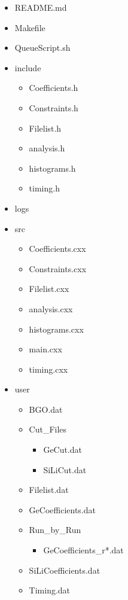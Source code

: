 \begin{itemize}[noitemsep, nolistsep]
    \item README.md
    \item Makefile
    \item QueueScript.sh
    \item include
    \begin{itemize}[noitemsep, nolistsep, label=\textbullet]
        \item Coefficients.h
        \item Constraints.h
        \item Filelist.h
        \item analysis.h
        \item histograms.h
        \item timing.h
    \end{itemize}
    \item logs
    \item src
    \begin{itemize}[noitemsep, nolistsep, label=\textbullet]
        \item Coefficients.cxx
        \item Constraints.cxx
        \item Filelist.cxx
        \item analysis.cxx
        \item histograms.cxx
        \item main.cxx
        \item timing.cxx
    \end{itemize}
    \item user
    \begin{itemize}[noitemsep, nolistsep, label=\textbullet]
        \item BGO.dat
        \item Cut\_Files
        \begin{itemize}[noitemsep, nolistsep, label=\textbullet]
            \item GeCut.dat
            \item SiLiCut.dat
        \end{itemize}
        \item Filelist.dat
        \item GeCoefficients.dat
        \item Run\_by\_Run
        \begin{itemize}[noitemsep, nolistsep, label=\textbullet]
            \item GeCoefficients\_r*.dat
        \end{itemize}
        \item SiLiCoefficients.dat
        \item Timing.dat
    \end{itemize}
\end{itemize}

